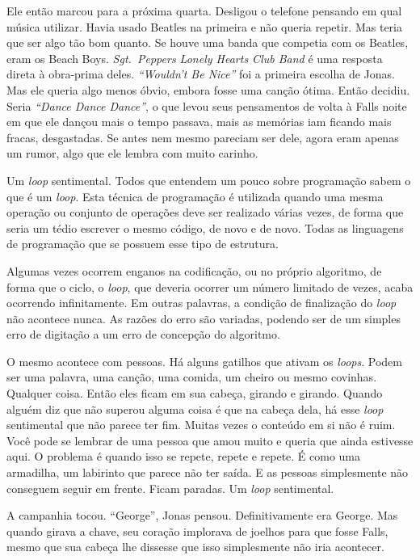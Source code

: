 Ele então marcou para a próxima quarta. Desligou o telefone pensando em qual música utilizar. Havia usado Beatles na primeira e não queria repetir. Mas teria que ser algo tão bom quanto. Se houve uma banda que competia com os Beatles, eram os Beach Boys. \foreignlanguage{english}{\emph{Sgt.~Peppers Lonely Hearts Club Band}} é uma resposta direta à obra-prima deles. \foreignlanguage{english}{\emph{``Wouldn't Be Nice''}} foi a primeira escolha de Jonas. Mas ele queria algo menos óbvio, embora fosse uma canção ótima. Então decidiu. Seria \foreignlanguage{english}{\emph{``Dance Dance Dance''}}, o que levou seus pensamentos de volta à Falls noite em que ele dançou mais o tempo passava, mais as memórias iam ficando mais fracas, desgastadas. Se antes nem mesmo pareciam ser dele, agora eram apenas um rumor, algo que ele lembra com muito carinho.

Um \emph{loop} sentimental. Todos que entendem um pouco sobre programação sabem o que é um \emph{loop}. Esta técnica de programação é utilizada quando uma mesma operação ou conjunto de operações deve ser realizado várias vezes, de forma que seria um tédio escrever o mesmo código, de novo e de novo. Todas as linguagens de programação que se  possuem esse tipo de estrutura.

Algumas vezes\mudanca{,} ocorrem enganos na codificação, ou no próprio algoritmo, de forma que o ciclo, o \emph{loop}, que deveria ocorrer um número limitado de vezes, acaba ocorrendo infinitamente. Em outras palavras, a condição de finalização do \emph{loop} não acontece nunca. As razões do erro são variadas, podendo ser de um simples erro de digitação a um erro de concepção do algoritmo.

O mesmo acontece com pessoas. Há alguns gatilhos que ativam os \emph{loops}. Podem ser uma palavra, uma canção, uma comida, um cheiro\mudanca{,} ou mesmo covinhas. Qualquer coisa. Então eles ficam em sua cabeça, girando e girando. Quando alguém diz que não superou alguma coisa é que\mudanca{,} na cabeça dela, há esse \emph{loop} sentimental que não parece ter fim. Muitas vezes o conteúdo em si não é ruim. Você pode se lembrar de uma pessoa que amou muito e queria que ainda estivesse aqui. O problema é quando isso se repete, repete e repete. É como uma armadilha, um labirinto que parece não ter saída. E as pessoas simplesmente não conseguem seguir em frente. Ficam paradas. Um \emph{loop} sentimental.

A campanhia tocou. ``George'', Jonas pensou. Definitivamente era George. Mas\mudanca{,} quando girava a chave, seu coração implorava de joelhos para que fosse Falls, mesmo que sua cabeça lhe dissesse que isso simplesmente não iria acontecer.

